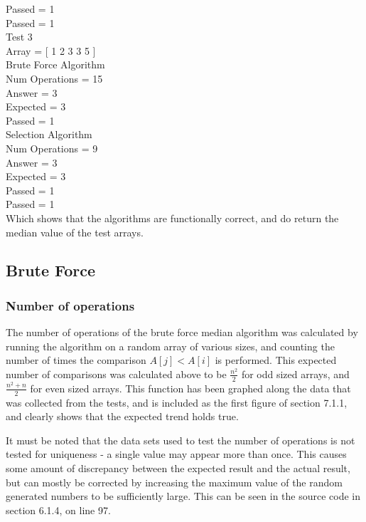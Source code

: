 \documentclass{article}
\newcommand\tab[1][1cm]{\hspace*{#1}}
\begin{document}
        \tab \tab \tab Passed = 1\\
        \tab Passed = 1\\
        Test 3\\
        \tab Array = [ 1 2 3 3 5 ]\\
        \tab \tab Brute Force Algorithm\\
        \tab \tab \tab Num Operations = 15\\
        \tab \tab \tab Answer = 3\\
        \tab \tab \tab Expected = 3\\
        \tab \tab \tab Passed = 1\\
        \tab \tab \tab Selection Algorithm\\
        \tab \tab \tab Num Operations = 9\\
        \tab \tab \tab Answer = 3\\
        \tab \tab \tab Expected = 3\\
        \tab \tab \tab Passed = 1\\
        \tab Passed = 1\\
        Which shows that the algorithms are functionally correct, and do return the median value of the test arrays.
    \subsection{Brute Force}
        \subsubsection{Number of operations}
            The number of operations of the brute force median algorithm was calculated by running the algorithm on a random array of various sizes, and counting the number of times the comparison $A[j] < A[i]$ is performed. This expected number of comparisons was calculated above to be $\frac{n^2}{2}$ for odd sized arrays, and $\frac{n^2 + n}{2}$ for even sized arrays. This function has been graphed along the data that was collected from the tests, and is included as the first figure of section 7.1.1, and clearly shows that the expected trend holds true.

            It must be noted that the data sets used to test the number of operations is not tested for uniqueness - a single value may appear more than once. This causes some amount of discrepancy between the expected result and the actual result, but can mostly be corrected by increasing the maximum value of the random generated numbers to be sufficiently large. This can be seen in the source code in section 6.1.4, on line 97.
\end{document}
